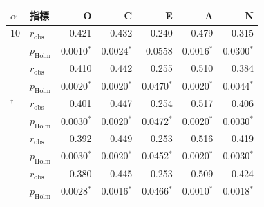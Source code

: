\begin{tabular}{llrrrrr}
\toprule
$\alpha$ & 指標 & O & C & E & A & N \\
\midrule
10 & $r_{\mathrm{obs}}$ & 0.421 & 0.432 & 0.240 & 0.479 & 0.315 \\
 & $p_{\mathrm{Holm}}$ & 0.0010$^{*}$ & 0.0024$^{*}$ & 0.0558 & 0.0016$^{*}$ & 0.0300$^{*}$ \\
\addlinespace
50 & $r_{\mathrm{obs}}$ & 0.410 & 0.442 & 0.255 & 0.510 & 0.384 \\
 & $p_{\mathrm{Holm}}$ & 0.0020$^{*}$ & 0.0020$^{*}$ & 0.0470$^{*}$ & 0.0020$^{*}$ & 0.0044$^{*}$ \\
\addlinespace
100$^{\dagger}$ & $r_{\mathrm{obs}}$ & 0.401 & 0.447 & 0.254 & 0.517 & 0.406 \\
 & $p_{\mathrm{Holm}}$ & 0.0030$^{*}$ & 0.0020$^{*}$ & 0.0472$^{*}$ & 0.0020$^{*}$ & 0.0030$^{*}$ \\
\addlinespace
200 & $r_{\mathrm{obs}}$ & 0.392 & 0.449 & 0.253 & 0.516 & 0.419 \\
 & $p_{\mathrm{Holm}}$ & 0.0030$^{*}$ & 0.0020$^{*}$ & 0.0452$^{*}$ & 0.0020$^{*}$ & 0.0030$^{*}$ \\
\addlinespace
500 & $r_{\mathrm{obs}}$ & 0.380 & 0.445 & 0.253 & 0.509 & 0.424 \\
 & $p_{\mathrm{Holm}}$ & 0.0028$^{*}$ & 0.0016$^{*}$ & 0.0466$^{*}$ & 0.0010$^{*}$ & 0.0018$^{*}$ \\
\bottomrule
\end{tabular}

